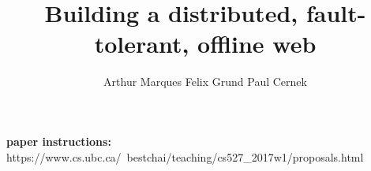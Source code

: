 \documentclass{article}
\title{Building a distributed, fault-tolerant, offline web}
\author{Arthur Marques \qquad Felix Grund \qquad Paul Cernek}
\begin{document}
\maketitle

\begin{abstract}

\end{abstract}

{\bf paper instructions:} https://www.cs.ubc.ca/~bestchai/teaching/cs527\_2017w1/proposals.html













\end{document}
